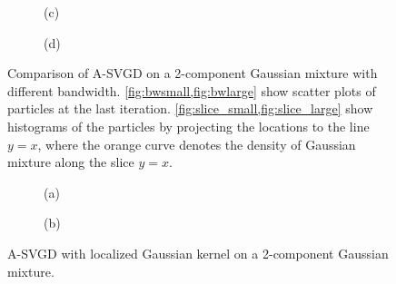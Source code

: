 \begin{figure}[t!]
\begin{subfigure}[b]{0.48\textwidth}
    \caption{(c)\label{fig:slice_small}}
\end{subfigure}
\hfill
\centering
\begin{subfigure}[b]{0.48\textwidth}
    \caption{(d)\label{fig:slice_large}}
\end{subfigure}


\caption{Comparison of A-SVGD on a 2-component Gaussian mixture with different bandwidth. \cref{fig:bwsmall,fig:bwlarge} show scatter plots of particles at the last iteration. \cref{fig:slice_small,fig:slice_large} show histograms of the particles by projecting the locations to the line $y = x$, where the orange curve denotes the density of Gaussian mixture along the slice $y = x$.}
\label{fig:differentBW}
\end{figure}


\begin{figure}[t!]
    
\end{figure}


\captionsetup[subfigure]{labelformat=empty}
\begin{figure}[t!]
    \centering 
\begin{subfigure}[b]{.48\textwidth} 
    \caption{(a) \label{fig:bwlocal}}
\end{subfigure}
\hfill
\centering
\begin{subfigure}[b]{0.48\textwidth}
    \caption{(b)\label{fig:slicelocal}}
\end{subfigure}

\caption{A-SVGD with localized Gaussian kernel on a 2-component Gaussian mixture.}
\label{fig:localbw}
\end{figure}


